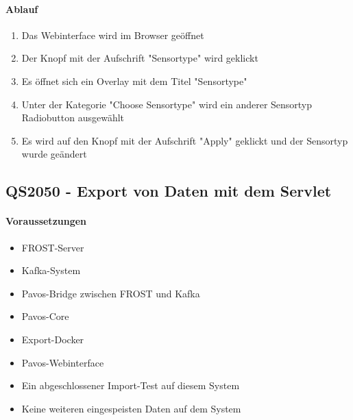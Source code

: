 \paragraph{Ablauf}
\begin{enumerate}
\item Das Webinterface wird im Browser geöffnet
\item Der Knopf mit der Aufschrift "Sensortype" wird  geklickt
\item Es öffnet sich ein Overlay mit dem Titel "Sensortype"
\item Unter der Kategorie "Choose Sensortype" wird ein anderer Sensortyp Radiobutton ausgewählt
\item Es wird auf den Knopf mit der Aufschrift "Apply" geklickt und der Sensortyp wurde geändert
\end{enumerate}
\szenarioGood

\subsection{QS2050 - Export von Daten mit dem Servlet}
\paragraph{Voraussetzungen}
\begin{itemize}
\item FROST-Server
\item Kafka-System
\item Pavos-Bridge zwischen FROST und Kafka
\item Pavos-Core
\item Export-Docker
\item Pavos-Webinterface
\item Ein abgeschlossener Import-Test auf diesem System
\item Keine weiteren eingespeisten Daten auf dem System
\end{itemize}

